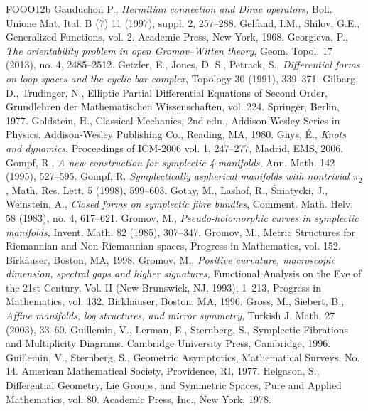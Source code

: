 \begin{thebibliography}{FOOO12b}
 Gauduchon P., \textit{Hermitian connection and Dirac operators,} Boll. Unione Mat. Ital. B (7) 11 (1997), suppl. 2, 257--288.
 Gelfand, I.M., Shilov, G.E., Generalized Functions, vol. 2. Academic Press, New York, 1968.
 Georgieva, P., \textit{The orientability problem in open Gromov--Witten theory}, Geom. Topol. 17 (2013), no. 4, 2485--2512.
 Getzler, E., Jones, D. S., Petrack, S., \textit{Differential forms on loop spaces and the cyclic bar complex}, Topology 30 (1991), 339--371.
 Gilbarg, D., Trudinger, N., Elliptic Partial Differential Equations of Second Order, Grundlehren der Mathematischen Wissenschaften, vol. 224. Springer, Berlin, 1977.
 Goldstein, H., Classical Mechanics, 2nd edn., Addison-Wesley Series in Physics. Addison-Wesley Publishing Co., Reading, MA, 1980.
 Ghys, É., \textit{Knots and dynamics}, Proceedings of ICM-2006 vol. 1, 247--277, Madrid, EMS, 2006.
 Gompf, R., \textit{A new construction for symplectic 4-manifolds}, Ann. Math. 142 (1995), 527--595.
 Gompf, R. \textit{Symplectically aspherical manifolds with nontrivial $\pi_2$ }, Math. Res. Lett. 5 (1998), 599--603.
 Gotay, M., Lashof, R., Śniatycki, J., Weinstein, A., \textit{Closed forms on symplectic fibre bundles}, Comment. Math. Helv. 58 (1983), no. 4, 617--621.
 Gromov, M., \textit{Pseudo-holomorphic curves in symplectic manifolds}, Invent. Math. 82 (1985), 307--347.
 Gromov, M., Metric Structures for Riemannian and Non-Riemannian spaces, Progress in Mathematics, vol. 152. Birkäuser, Boston, MA, 1998.
 Gromov, M., \textit{Positive curvature, macroscopic dimension, spectral gaps and higher signatures,} Functional Analysis on the Eve of the 21st Century, Vol. II (New Brunswick, NJ, 1993), 1--213, Progress in Mathematics, vol. 132. Birkhäuser, Boston, MA, 1996.
 Gross, M., Siebert, B., \textit{Affine manifolds, log structures, and mirror symmetry}, Turkish J. Math. 27 (2003), 33--60.
 Guillemin, V., Lerman, E., Sternberg, S., Symplectic Fibrations and Multiplicity Diagrams. Cambridge University Press, Cambridge, 1996.
 Guillemin, V., Sternberg, S., Geometric Asymptotics, Mathematical Surveys, No. 14. American Mathematical Society, Providence, RI, 1977.
 Helgason, S., Differential Geometry, Lie Groups, and Symmetric Spaces, Pure and Applied Mathematics, vol. 80. Academic Press, Inc., New York, 1978.

\end{thebibliography}
